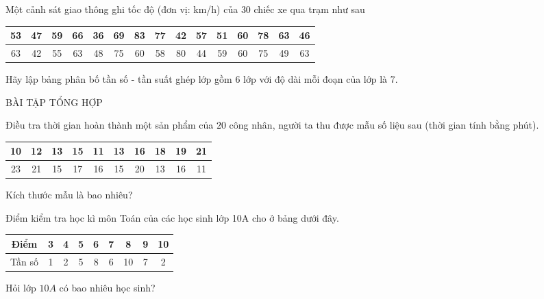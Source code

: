 \begin{bt}%
Một cảnh sát giao thông ghi tốc độ (đơn vị: km/h) của $30$ chiếc xe qua trạm như sau
\begin{center}
\begin{tabular}{|c|c|c|c|c|c|c|c|c|c|c|c|c|c|c|}
\hline 
53 & 47 & 59 & 66 & 36 & 69 & 83 & 77 & 42 & 57 & 51 & 60 & 78 & 63 & 46 \\ 
\hline 
63 & 42 & 55 & 63 & 48 & 75 & 60 & 58 & 80 & 44 & 59 & 60 & 75 & 49 & 63 \\ 
\hline 
\end{tabular} 
\end{center}
Hãy lập bảng phân bố tần số - tần suất ghép lớp gồm 6 lớp với độ dài mỗi đoạn của lớp là 7.
\end{bt}
\setcounter{bt}{0}
\begin{center}
BÀI TẬP TỔNG HỢP
\end{center}
\begin{bt}%
	Điều tra thời gian hoàn thành một sản phẩm của $20$ công nhân, người ta thu được mẫu số liệu sau (thời gian tính bằng phút).
	\begin{center}
		\begin{tabular}{|c|c|c|c|c|c|c|c|c|c|}\hline
			{10}&{12}&{13}&{15}&{11}&{13}&{16}&{18}&{19}&{21}\\ \hline 
			{23}&{21}&{15}&{17}&{16}&{15}&{20}&{13}&{16}&{11}\\ \hline
		\end{tabular}
	\end{center}
	Kích thước mẫu là bao nhiêu?
\end{bt}


\begin{bt}%
	Điểm kiểm tra học kì môn Toán của các học sinh lớp 10A cho ở bảng dưới đây.
	\begin{center}
\begin{tabular}{|c|c|c|c|c|c|c|c|c|}
			\hline
			Điểm   & 3 & 4 & 5 & 6 & 7 & 8 & 9 & 10 \\ 
			\hline
			Tần số & 1 & 2 & 5 & 8 & 6 & 10 & 7 & 2 \\ 
			\hline
		\end{tabular}
	\end{center}
Hỏi lớp $10A$ có bao nhiêu học sinh?
    \end{bt}

